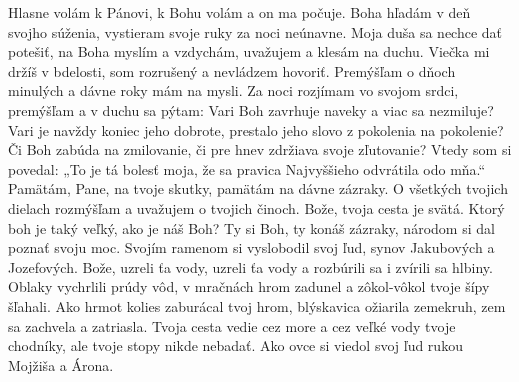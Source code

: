 Hlasne volám k Pánovi,
k Bohu volám a on ma počuje.
\versseparator
Boha hľadám v deň svojho súženia,
vystieram svoje ruky za noci
neúnavne.
\versseparator
Moja duša sa nechce dať potešiť,
na Boha myslím a vzdychám,
uvažujem a klesám na duchu.
\versseparator
Viečka mi držíš v bdelosti,
som rozrušený a nevládzem hovoriť.
\versseparator
Premýšľam o dňoch minulých
a dávne roky mám na mysli.
\versseparator
Za noci rozjímam vo svojom srdci,
premýšľam a v duchu sa pýtam:
\versseparator
Vari Boh zavrhuje naveky
a viac sa nezmiluje?
\versseparator
Vari je navždy koniec jeho dobrote,
prestalo jeho slovo z pokolenia na pokolenie?
\versseparator
Či Boh zabúda na zmilovanie,
či pre hnev zdržiava svoje zľutovanie?
\versseparator
Vtedy som si povedal: „To je tá bolesť moja,
že sa pravica Najvyššieho odvrátila odo mňa.“
\versseparator
Pamätám, Pane, na tvoje skutky,
pamätám na dávne zázraky.
\versseparator
O všetkých tvojich dielach rozmýšľam
a uvažujem o tvojich činoch.
\versseparator
Bože, tvoja cesta je svätá.
Ktorý boh je taký veľký, ako je náš Boh?
Ty si Boh, ty konáš zázraky,
\versseparator
národom si dal poznať svoju moc.
Svojím ramenom si vyslobodil svoj ľud,
synov Jakubových a Jozefových.
\versseparator
Bože, uzreli ťa vody,
uzreli ťa vody a rozbúrili sa
i zvírili sa hlbiny.
\versseparator
Oblaky vychrlili prúdy vôd,
v mračnách hrom zadunel
\versseparator
a zôkol-vôkol tvoje šípy šľahali.
Ako hrmot kolies zaburácal tvoj hrom,
\versseparator
blýskavica ožiarila zemekruh,
zem sa zachvela a zatriasla.
\versseparator
Tvoja cesta vedie cez more a cez veľké vody tvoje chodníky,
ale tvoje stopy nikde nebadať.
\versseparator
Ako ovce si viedol svoj ľud
rukou Mojžiša a Árona.